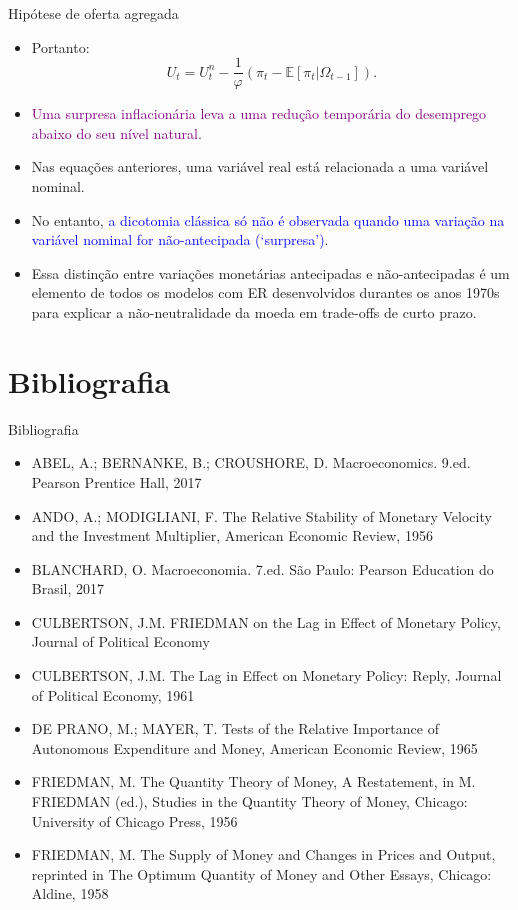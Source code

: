 \documentclass[10pt]{beamer}
\begin{document}
\begin{frame}{Hipótese de oferta agregada}
    \begin{itemize}
        \item Portanto:
        \begin{equation}
            U_t = U_t^n - \frac{1}{\varphi}(\pi_t - \mathbb{E}[\pi_t|\Omega_{t-1}]).
            \label{eq8}
        \end{equation}
        \bigskip
        \item \textcolor{purple}{Uma surpresa inflacionária leva a uma redução temporária do desemprego abaixo do seu nível natural}.
        \bigskip
        \item Nas equações anteriores, uma variável real está relacionada a uma variável nominal.
        \bigskip
        \item No entanto, \textcolor{blue}{a dicotomia clássica só não é observada quando uma variação na variável nominal for não-antecipada (`surpresa')}.
        \bigskip
        \item Essa distinção entre variações monetárias antecipadas e não-antecipadas é um elemento de todos os modelos com ER desenvolvidos durantes os anos 1970s para explicar a não-neutralidade da moeda em trade-offs de curto prazo.
    \end{itemize}
\end{frame}

\section{Bibliografia}
\begin{frame}{ Bibliografia}
    \begin{itemize}   
        \item ABEL, A.; BERNANKE, B.; CROUSHORE, D. Macroeconomics. 9.ed. Pearson Prentice Hall, 2017\medskip        
        \item ANDO, A.; MODIGLIANI, F. The Relative Stability of Monetary Velocity and the Investment Multiplier, American Economic Review, 1956 \medskip
        \item BLANCHARD, O. Macroeconomia. 7.ed. São Paulo: Pearson Education do Brasil, 2017\medskip                     
        \item CULBERTSON, J.M. FRIEDMAN on the Lag in Effect of Monetary Policy, Journal of Political Economy \medskip
        \item CULBERTSON, J.M. The Lag in Effect on Monetary Policy: Reply, Journal of Political Economy, 1961 \medskip
        \item DE PRANO, M.; MAYER, T. Tests of the Relative Importance of Autonomous Expenditure and Money, American Economic Review, 1965 \medskip
        \item FRIEDMAN, M. The Quantity Theory of Money, A Restatement, in M. FRIEDMAN (ed.), Studies in the Quantity Theory of Money, Chicago: University of Chicago Press, 1956 \medskip
        \item FRIEDMAN, M. The Supply of Money and Changes in Prices and Output, reprinted in The Optimum Quantity of Money and Other Essays, Chicago: Aldine, 1958 \medskip        
    \end{itemize}
\end{frame}
\end{document}
